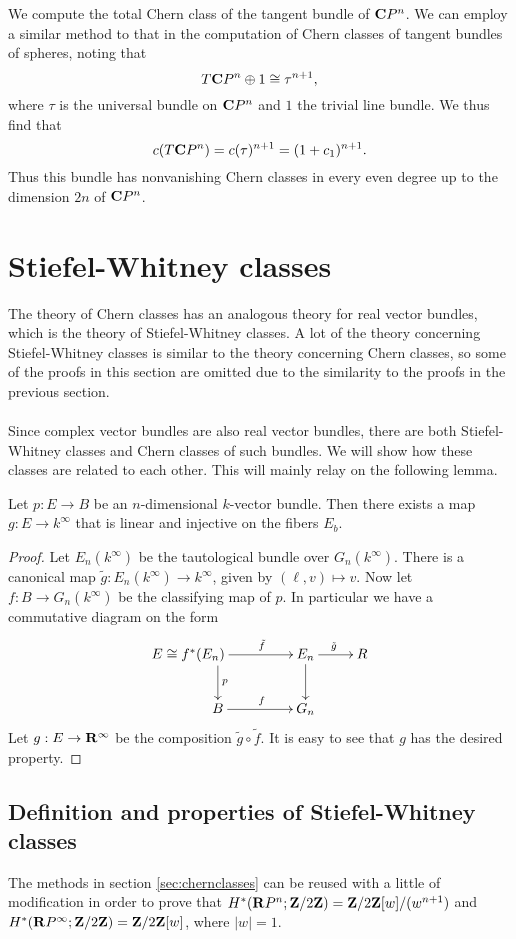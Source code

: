 \documentclass[a4paper,openany]{scrbook}
\begin{document}
\begin{example}\label{exa:chernclassofcpn}
We compute the total Chern class of the tangent bundle of $\mathbf C P^n$. We can employ a similar method to that in the computation of Chern classes of tangent bundles of spheres, noting that
\[
T\mathbf C P^n \oplus 1 \cong \tau^{n+1},
\]
where $\tau$ is the universal bundle on $\mathbf C P^n$ and $1$ the trivial line bundle. We thus find that
\[
c(T\mathbf C P^n) = c(\tau)^{n+1} = (1+c_1)^{n+1}.
\]
Thus this bundle has nonvanishing Chern classes in every even degree up to the dimension $2n$ of $\mathbf C P^n$.
\end{example}

\section{Stiefel-Whitney classes}
The theory of Chern classes has an analogous theory for real vector bundles, which is the theory of Stiefel-Whitney classes. A lot of the theory concerning Stiefel-Whitney classes is similar to the theory concerning Chern classes, so some of the proofs in this section are omitted due to the similarity to the proofs in the previous section.
\\\\
Since complex vector bundles are also real vector bundles, there are both Stiefel-Whitney classes and Chern classes of such bundles. We will show how these classes are related to each other. This will mainly relay on the following lemma.

\begin{lemma}\label{lemma:linearonfibers}
Let $p:E\to B$ be an $n$-dimensional $k$-vector bundle. Then there exists a map $g: E\to k^\infty$ that is linear and injective on the fibers $E_b$. 
\end{lemma}
\begin{proof}
Let $E_n(k^\infty)$ be the tautological bundle over $G_n(k^\infty)$. There is a canonical map $\tilde g: E_n(k^\infty)\to k^\infty$, given by $(\ell,v)\mapsto v$. Now let $f:B\to G_n(k^\infty)$ be the classifying map of $p$. In particular we have  a commutative diagram on the form
$$\xymatrix{*+[l]{E\cong f^*(E_n)}\ar[r]^{\tilde f}\ar[d]^p & E_n\ar[d]\ar[r]^{\tilde g} & R\\
 B\ar[r]^f & G_n
}$$
Let $g: E\to \mathbf R^\infty$ be the composition $\tilde g\circ\tilde f$. It is easy to see that $g$ has the desired property.
\end{proof}

\subsection{Definition and properties of Stiefel-Whitney classes}\label{subsec:dfnSWclasses}
The methods  in section \ref{sec:chernclasses} can be reused with a little of modification in order to prove that $H^*(\mathbf R P^n;\mathbf Z/2\mathbf Z)= \mathbf Z/2\mathbf Z[w]/(w^{n+1})$ and $H^*(\mathbf R P^\infty;\mathbf Z/2\mathbf Z)= \mathbf Z/2\mathbf Z[w]$, where $|w|=1$. 
\end{document}
